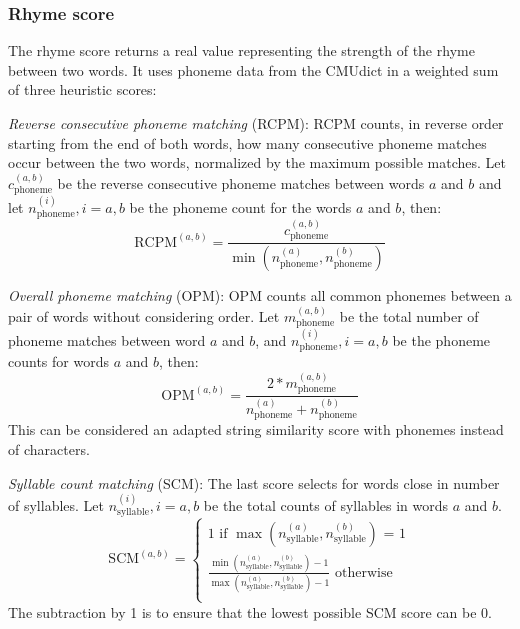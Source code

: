 \documentclass[11pt,a4paper]{article}
\newenvironment{tight_itemize}{
\begin{itemize}
\setlength{\itemsep}{0pt}
\setlength{\parskip}{0pt}
}{\end{itemize}}
\begin{document}
\subsubsection{Rhyme score}
\label{sec:rhymescore}
The rhyme score returns a real value representing the strength of the rhyme between two words. It uses phoneme data from the CMUdict in a weighted sum of three heuristic scores:
\begin{tight_itemize}
	\vspace{-0.5em}
	\item \textit{Reverse consecutive phoneme matching} (RCPM):
	RCPM counts, in reverse order starting from the end of both words, how many consecutive phoneme matches occur between the two words, normalized by the maximum possible matches. Let $c^{(a,b)}_{\text{phoneme}}$ be the reverse consecutive phoneme matches between words $a$ and $b$ and let $n^{(i)}_{\text{phoneme}}, i = {a, b}$ be the phoneme count for the words $a$ and $b$, then:
	$$\textrm{RCPM}^{(a,b)} = \frac{c^{(a,b)}_{\text{phoneme}}}{\min(n^{(a)}_{\text{phoneme}}, n^{(b)}_{\text{phoneme}})}$$
	\item \textit{Overall phoneme matching} (OPM):
		OPM counts all common phonemes between a pair of words without considering order. Let $m^{(a,b)}_{\text{phoneme}}$ be the total number of phoneme matches between word $a$ and $b$, and $n^{(i)}_{\text{phoneme}}, i = {a, b}$ be the phoneme counts for words $a$ and $b$, then:
		$$\textrm{OPM}^{(a,b)} = \frac{2 * m^{(a,b)}_{\text{phoneme}}}{n^{(a)}_{\text{phoneme}} + n^{(b)}_{\text{phoneme}}}$$
		This can be considered an adapted \citet{ratcliff} string similarity score with phonemes instead of characters.
	\item \textit{Syllable count matching} (SCM):
	The last score selects for words close in number of syllables. Let $n^{(i)}_{\text{syllable}}, i = {a, b}$ be the total counts of syllables in words $a$ and $b$.
	\begin{equation}
	\textrm{SCM}^{(a,b)} = 
	\begin{cases}
	\nonumber 1 \text{ if $\max(n^{(a)}_{\text{syllable}}, n^{(b)}_{\text{syllable}})$ = 1}\\
	\nonumber \frac{\min(n^{(a)}_{\text{syllable}}, n^{(b)}_{\text{syllable}}) - 1}{\max(n^{(a)}_{\text{syllable}}, n^{(b)}_{\text{syllable}}) - 1} \text{ otherwise}\\
        \end{cases}
	\end{equation}
	The subtraction by 1 is to ensure that the lowest possible SCM score can be 0.
\end{tight_itemize}
\end{document}
